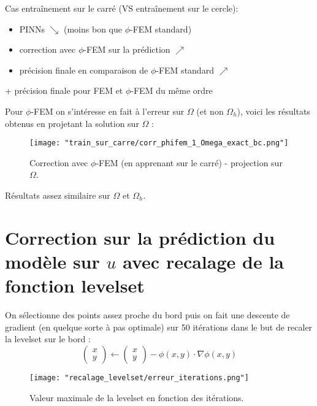\begin{Obs}
	Cas entraînement sur le carré (VS entraînement sur le cercle):
	\begin{itemize}
		\item PINNs $\searrow$ (moins bon que $\phi$-FEM standard)
		\item correction avec $\phi$-FEM sur la prédiction $\nearrow$
		\item précision finale en comparaison de $\phi$-FEM standard $\nearrow$
	\end{itemize}
	+ précision finale pour FEM et $\phi$-FEM du même ordre
\end{Obs}

Pour $\phi$-FEM on s'intéresse en fait à l'erreur sur $\Omega$ (et non $\Omega_h$), voici les résultats obtenus en projetant la solution sur $\Omega$ :

\begin{figure}[H]
	\centering
	\texttt{[image: "train\_sur\_carre/corr\_phifem\_1\_Omega\_exact\_bc.png"]}
	\caption{Correction avec $\phi$-FEM (en apprenant sur le carré) - projection sur $\Omega$.}
\end{figure}

\begin{Obs}
	Résultats assez similaire sur $\Omega$ et $\Omega_h$.
\end{Obs}

\newpage

\section{Correction sur la prédiction du modèle sur $u$ avec recalage de la fonction levelset}

\begin{minipage}{0.58\linewidth}
	On sélectionne des points assez proche du bord puis on fait une descente de gradient (en quelque sorte à pas optimale) sur 50 itérations dans le but de recaler la levelset sur le bord :
	\begin{equation*}
		\begin{pmatrix}
			x \\
			y
		\end{pmatrix}\leftarrow\begin{pmatrix}
			x \\
			y
		\end{pmatrix}-\phi(x,y)\cdot\nabla\phi(x,y)
	\end{equation*}
\end{minipage}
\begin{minipage}{0.38\linewidth}
	\begin{figure}[H]
		\centering
		\texttt{[image: "recalage\_levelset/erreur\_iterations.png"]}
		\caption{Valeur maximale de la levelset en fonction des itérations.}
	\end{figure}
\end{minipage}



